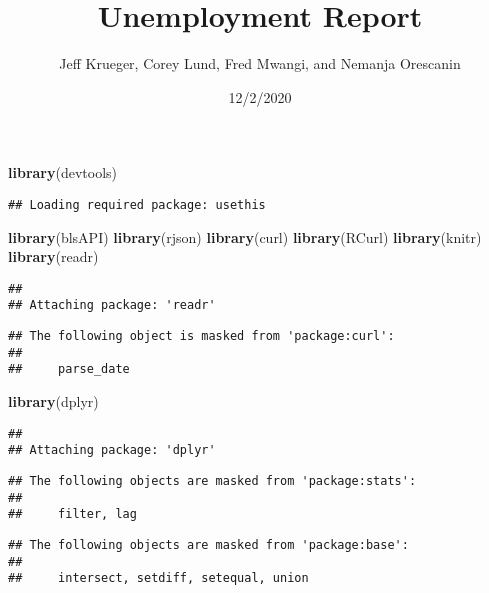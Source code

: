 \documentclass[
]{article}
\title{Unemployment Report}
\author{Jeff Krueger, Corey Lund, Fred Mwangi, and Nemanja Orescanin}
\date{12/2/2020}
\newenvironment{Shaded}{\begin{snugshade}}{\end{snugshade}}
\newcommand{\KeywordTok}[1]{\textcolor[rgb]{0.13,0.29,0.53}{\textbf{#1}}}
\newcommand{\NormalTok}[1]{#1}
\begin{document}
\maketitle

\begin{Shaded}
\begin{Highlighting}[]
\KeywordTok{library}\NormalTok{(devtools)}
\end{Highlighting}
\end{Shaded}

\begin{verbatim}
## Loading required package: usethis
\end{verbatim}

\begin{Shaded}
\begin{Highlighting}[]
\KeywordTok{library}\NormalTok{(blsAPI)}
\KeywordTok{library}\NormalTok{(rjson)}
\KeywordTok{library}\NormalTok{(curl)}
\KeywordTok{library}\NormalTok{(RCurl)}
\KeywordTok{library}\NormalTok{(knitr)}
\KeywordTok{library}\NormalTok{(readr)}
\end{Highlighting}
\end{Shaded}

\begin{verbatim}
## 
## Attaching package: 'readr'
\end{verbatim}

\begin{verbatim}
## The following object is masked from 'package:curl':
## 
##     parse_date
\end{verbatim}

\begin{Shaded}
\begin{Highlighting}[]
\KeywordTok{library}\NormalTok{(dplyr)}
\end{Highlighting}
\end{Shaded}

\begin{verbatim}
## 
## Attaching package: 'dplyr'
\end{verbatim}

\begin{verbatim}
## The following objects are masked from 'package:stats':
## 
##     filter, lag
\end{verbatim}

\begin{verbatim}
## The following objects are masked from 'package:base':
## 
##     intersect, setdiff, setequal, union
\end{verbatim}
\end{document}

